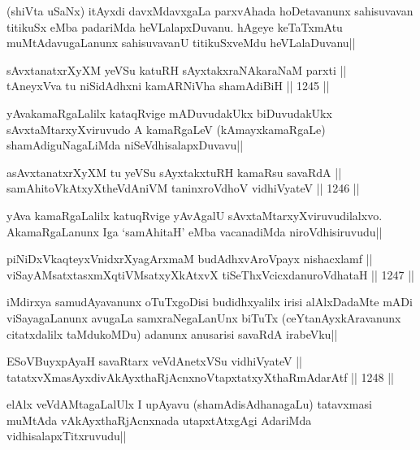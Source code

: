 \begin{artha}
(shiVta uSaNx) itAyxdi davxMdavxgaLa parxvAhada hoDetavanunx sahisuvavan titikuSx eMba padariMda heVLalapxDuvanu. hAgeye keTaTxmAtu muMtAdavugaLanunx sahisuvavanU titikuSxveMdu heVLalaDuvanu||
\end{artha}

\begin{shl}
sAvxtanatxrXyXM yeVSu katuRH sAyxtakxraNAkaraNaM parxti || \\
tAneyxVva tu niSidAdhxni kamARNiVha shamAdiBiH ||  1245 ||  
\end{shl}

\begin{artha}
yAvakamaRgaLalilx kataqRvige mADuvudakUkx biDuvudakUkx sAvxtaMtarxyXviruvudo A kamaRgaLeV (kAmayxkamaRgaLe) shamAdiguNagaLiMda niSeVdhisalapxDuvavu||
\end{artha}

\begin{shl}
asAvxtanatxrXyXM tu yeVSu sAyxtakxtuRH kamaRsu savaRdA || \\
samAhitoVkAtxyX\s theVdAniVM taninxroVdhoV vidhiVyateV ||  1246 || 
\end{shl}

\begin{artha}
yAva kamaRgaLalilx katuqRvige yAvAgalU sAvxtaMtarxyXviruvudilalxvo. AkamaRgaLanunx Iga `samAhitaH' eMba vacanadiMda niroVdhisiruvudu||
\end{artha}

\begin{shl}
piNiDxVkaqteyxVnidxrXyagArxmaM budAdhxvAroVpayx nishacxlamf || \\
viSayAMsatxtasxmXqtiVMsatxyXkAtxvX tiSeThxVcicxdanuroVdhataH ||  1247 ||  
\end{shl}

\begin{artha}
iMdirxya samudAyavanunx oTuTxgoDisi budidhxyalilx irisi alAlxDadaMte mADi viSayagaLanunx avugaLa samxraNegaLanUnx biTuTx (ceYtanAyxkAravanunx citatxdalilx taMdukoMDu) adanunx anusarisi savaRdA irabeVku||
\end{artha}

\begin{shl}
ESoV\s BuyxpAyaH savaRtarx veVdAnetxVSu vidhiVyateV || \\
tatatxvXmasAyxdivAkAyxthaRjAcnxnoVtapxtatxyXthaRmAdarAtf ||  1248 ||  
\end{shl}

\begin{artha}
elAlx veVdAMtagaLalUlx I upAyavu (shamAdisAdhanagaLu) tatavxmasi muMtAda vAkAyxthaRjAcnxnada utapxtAtxgAgi AdariMda vidhisalapxTitxruvudu||
\end{artha}


